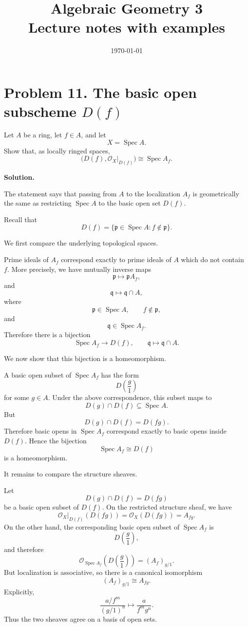 \documentclass[12pt,a4paper]{article}
\title{\bfseries Algebraic Geometry 3\\


\large Lecture notes with examples}
\author{}
\date{\today}
\newcommand{\Spec}{\operatorname{Spec}}
\theoremstyle{notespace}
\begin{document}
\maketitle
\tableofcontents
\clearpage

\section{Problem 11. The basic open subscheme \(D(f)\)}

Let \(A\) be a ring, let \(f\in A\), and let
\[
X=\Spec A.
\]
Show that, as locally ringed spaces,
\[
\bigl(D(f),\mathcal O_X|_{D(f)}\bigr)\cong \Spec A_f .
\]

\textbf{Solution.}

The statement says that passing from \(A\) to the localization \(A_f\) is geometrically the same as restricting \(\Spec A\) to the basic open set \(D(f)\).

Recall that
\[
D(f)=\{\mathfrak p\in \Spec A : f\notin \mathfrak p\}.
\]

We first compare the underlying topological spaces.

Prime ideals of \(A_f\) correspond exactly to prime ideals of \(A\) which do not contain \(f\). More precisely, we have mutually inverse maps
\[
\mathfrak p \longmapsto \mathfrak pA_f,
\]
and
\[
\mathfrak q \longmapsto \mathfrak q\cap A,
\]
where
\[
\mathfrak p\in \Spec A,\qquad f\notin \mathfrak p,
\]
and
\[
\mathfrak q\in \Spec A_f.
\]
Therefore there is a bijection
\[
\Spec A_f \longrightarrow D(f),
\qquad
\mathfrak q\longmapsto \mathfrak q\cap A.
\]

We now show that this bijection is a homeomorphism.

A basic open subset of \(\Spec A_f\) has the form
\[
D\left(\frac g1\right)
\]
for some \(g\in A\). Under the above correspondence, this subset maps to
\[
D(g)\cap D(f)\subseteq \Spec A.
\]
But
\[
D(g)\cap D(f)=D(fg).
\]
Therefore basic opens in \(\Spec A_f\) correspond exactly to basic opens inside \(D(f)\). Hence the bijection
\[
\Spec A_f \cong D(f)
\]
is a homeomorphism.

It remains to compare the structure sheaves.

Let
\[
D(g)\cap D(f)=D(fg)
\]
be a basic open subset of \(D(f)\). On the restricted structure sheaf, we have
\[
\mathcal O_X|_{D(f)}(D(fg))
=
\mathcal O_X(D(fg))
=
A_{fg}.
\]
On the other hand, the corresponding basic open subset of \(\Spec A_f\) is
\[
D\left(\frac g1\right),
\]
and therefore
\[
\mathcal O_{\Spec A_f}\left(D\left(\frac g1\right)\right)
=
(A_f)_{g/1}.
\]
But localization is associative, so there is a canonical isomorphism
\[
(A_f)_{g/1}\cong A_{fg}.
\]
Explicitly,
\[
\frac{a/f^m}{(g/1)^n}
\longmapsto
\frac{a}{f^mg^n}.
\]
Thus the two sheaves agree on a basis of open sets.
\end{document}
